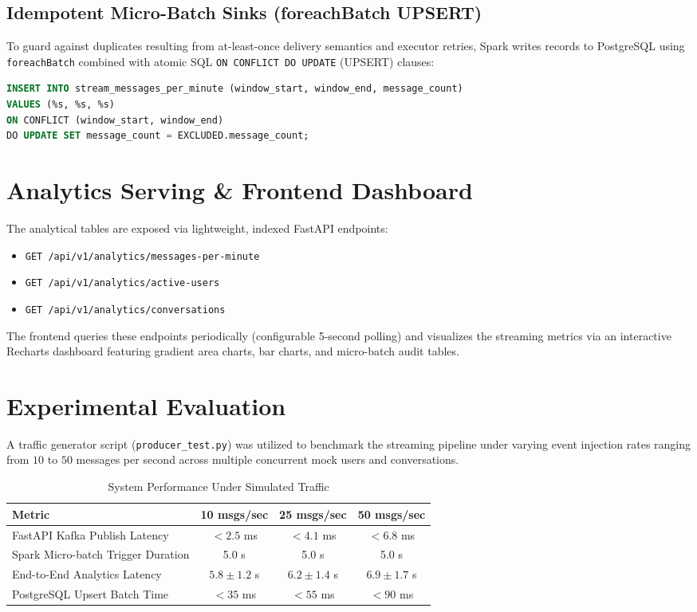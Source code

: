 \documentclass[11pt,a4paper]{article}
\begin{document}
\subsection{Idempotent Micro-Batch Sinks (foreachBatch UPSERT)}
To guard against duplicates resulting from at-least-once delivery semantics and executor retries, Spark writes records to PostgreSQL using \texttt{foreachBatch} combined with atomic SQL \texttt{ON CONFLICT DO UPDATE} (UPSERT) clauses:
\begin{lstlisting}[language=SQL]
INSERT INTO stream_messages_per_minute (window_start, window_end, message_count)
VALUES (%s, %s, %s)
ON CONFLICT (window_start, window_end)
DO UPDATE SET message_count = EXCLUDED.message_count;
\end{lstlisting}

\section{Analytics Serving \& Frontend Dashboard}
The analytical tables are exposed via lightweight, indexed FastAPI endpoints:
\begin{itemize}
    \item \texttt{GET /api/v1/analytics/messages-per-minute}
    \item \texttt{GET /api/v1/analytics/active-users}
    \item \texttt{GET /api/v1/analytics/conversations}
\end{itemize}
The frontend queries these endpoints periodically (configurable 5-second polling) and visualizes the streaming metrics via an interactive Recharts dashboard featuring gradient area charts, bar charts, and micro-batch audit tables.

\section{Experimental Evaluation}
A traffic generator script (\texttt{producer\_test.py}) was utilized to benchmark the streaming pipeline under varying event injection rates ranging from $10$ to $50$ messages per second across multiple concurrent mock users and conversations.

\begin{table}[h]
\centering
\caption{System Performance Under Simulated Traffic}
\begin{tabular}{@{}lccc@{}}
\toprule
Metric & 10 msgs/sec & 25 msgs/sec & 50 msgs/sec \\
\midrule
FastAPI Kafka Publish Latency & $<2.5$ ms & $<4.1$ ms & $<6.8$ ms \\
Spark Micro-batch Trigger Duration & 5.0 s & 5.0 s & 5.0 s \\
End-to-End Analytics Latency & $5.8 \pm 1.2$ s & $6.2 \pm 1.4$ s & $6.9 \pm 1.7$ s \\
PostgreSQL Upsert Batch Time & $<35$ ms & $<55$ ms & $<90$ ms \\
\bottomrule
\end{tabular}
\end{table}
\end{document}
